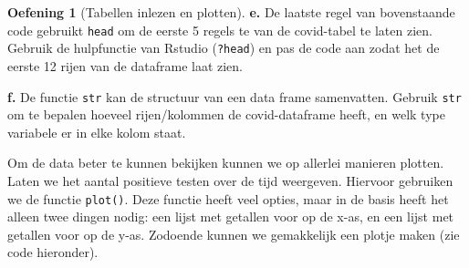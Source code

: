 \documentclass[
  a4paper,
]{scrbook}
\newenvironment{Shaded}{\begin{snugshade}}{\end{snugshade}}
\newcommand{\AttributeTok}[1]{\textcolor[rgb]{0.40,0.45,0.13}{#1}}
\newcommand{\CommentTok}[1]{\textcolor[rgb]{0.37,0.37,0.37}{#1}}
\newcommand{\DecValTok}[1]{\textcolor[rgb]{0.68,0.00,0.00}{#1}}
\newcommand{\FunctionTok}[1]{\textcolor[rgb]{0.28,0.35,0.67}{#1}}
\newcommand{\NormalTok}[1]{\textcolor[rgb]{0.00,0.23,0.31}{#1}}
\newcommand{\OtherTok}[1]{\textcolor[rgb]{0.00,0.23,0.31}{#1}}
\newcommand{\SpecialCharTok}[1]{\textcolor[rgb]{0.37,0.37,0.37}{#1}}
\newcommand{\StringTok}[1]{\textcolor[rgb]{0.13,0.47,0.30}{#1}}
\theoremstyle{definition}
\newtheorem{exercise}{Oefening}[chapter]
\theoremstyle{remark}
\begin{document}
\begin{exercise}[Tabellen inlezen en
plotten]
\textbf{e.} De laatste regel van bovenstaande code gebruikt
\texttt{head} om de eerste 5 regels te van de covid-tabel te laten zien.
Gebruik de hulpfunctie van Rstudio (\texttt{?head}) en pas de code aan
zodat het de eerste 12 rijen van de dataframe laat zien.

\textbf{f.} De functie \texttt{str} kan de structuur van een data frame
samenvatten. Gebruik \texttt{str} om te bepalen hoeveel rijen/kolommen
de covid-dataframe heeft, en welk type variabele er in elke kolom staat.

Om de data beter te kunnen bekijken kunnen we op allerlei manieren
plotten. Laten we het aantal positieve testen over de tijd weergeven.
Hiervoor gebruiken we de functie \texttt{plot()}. Deze functie heeft
veel opties, maar in de basis heeft het alleen twee dingen nodig: een
lijst met getallen voor op de x-as, en een lijst met getallen voor op de
y-as. Zodoende kunnen we gemakkelijk een plotje maken (zie code
hieronder).

\begin{Shaded}
\end{Shaded}


\end{exercise}
\end{document}
